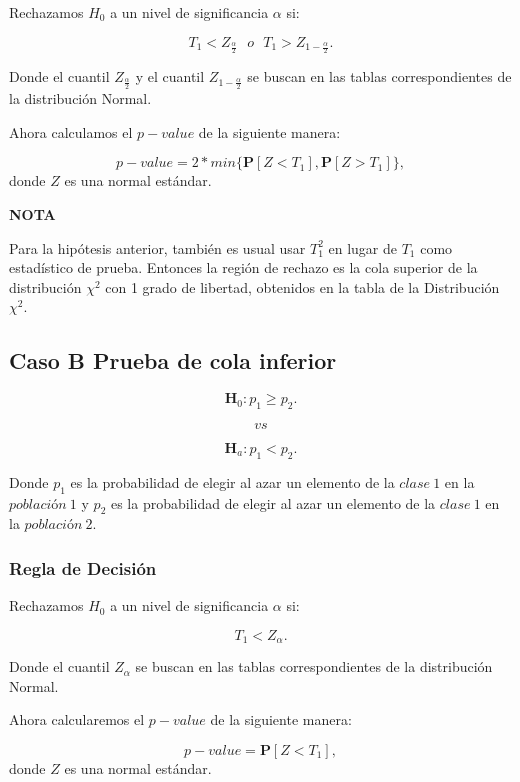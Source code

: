 \documentclass[
  a4paper,
  oneside,
  openany]{book}
\begin{document}
Rechazamos \(H_0\) a un nivel de significancia \(\alpha\) si:

\[T_{1}< Z_\frac{\alpha}{2} \ \ \    o  \ \ \  T_{1} > Z_{1-\frac{\alpha}{2}}.\]

Donde el cuantil \(Z_\frac{\alpha}{2}\) y el cuantil \(Z_{1-\frac{\alpha}{2}}\) se buscan en las tablas correspondientes de la distribución Normal.

Ahora calculamos el \(p-value\) de la siguiente manera:

\[p-value=2*min\{ \mathbf{P}[Z<T_{1}],\mathbf{P}[Z>T_{1}]\},\]
donde \(Z\) es una normal estándar.

\textbf{NOTA}

Para la hipótesis anterior, también es usual usar \(T_{1}^2\) en lugar de \(T_{1}\) como estadístico de prueba. Entonces la región de rechazo es la cola superior de la distribución \(\chi^2\) con 1 grado de libertad, obtenidos en la tabla de la Distribución \(\chi^2\).

\hypertarget{caso-b-prueba-de-cola-inferior-6}{%
\subsection*{Caso B Prueba de cola inferior}\label{caso-b-prueba-de-cola-inferior-6}}


\[\textbf{H}_0: p_{1} \geq p_{2}.\]

\[vs\]

\[\textbf{H}_a: p_{1} < p_{2}.\]

Donde \(p_{1}\) es la probabilidad de elegir al azar un elemento de la \(clase\ 1\) en la \(población\ 1\) y \(p_{2}\) es la probabilidad de elegir al azar un elemento de la \(clase\ 1\) en la \(población\ 2\).

\hypertarget{regla-de-decisiuxf3n-22}{%
\subsubsection*{Regla de Decisión}\label{regla-de-decisiuxf3n-22}}


Rechazamos \(H_0\) a un nivel de significancia \(\alpha\) si:

\[T_{1}< Z_{\alpha}.\]

Donde el cuantil \(Z_{\alpha}\) se buscan en las tablas correspondientes de la distribución Normal.

Ahora calcularemos el \(p-value\) de la siguiente manera:

\[p-value=\mathbf{P}[Z<T_{1}],\]
donde \(Z\) es una normal estándar.
\end{document}
